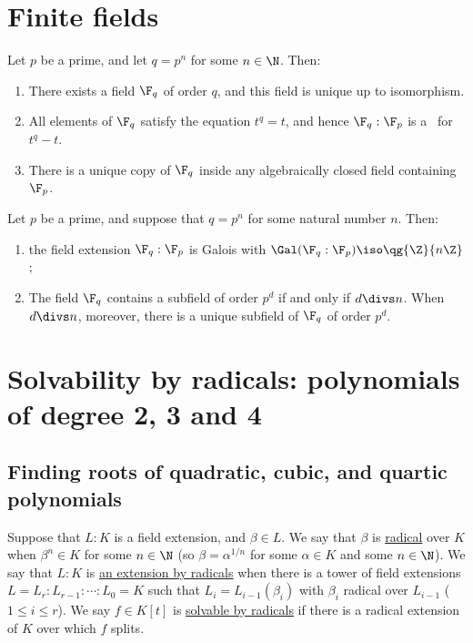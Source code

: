 \documentclass{article}
\begin{document}
\section{Finite fields}
  \begin{ttheorem}
    Let \( p \) be a prime, and let \( q=p^n \) for some \( n\in \N \).
    Then: \begin{enumerate}[label=(\alph*)]
      \item There exists a field \( \F_q \) of order \( q \), and this field is unique up to isomorphism.
      \item All elements of \( \F_q \) satisfy the equation \( t^q=t \), and hence \( \F_q:\F_p \) is a \sfe~for \( t^q-t \).
      \item There is a unique copy of \( \F_q \) inside any algebraically closed field containing \( \F_p \).
    \end{enumerate}
  \end{ttheorem}

  \begin{ttheorem}
    Let \( p \) be a prime, and suppose that \( q=p^n \) for some natural number \( n \).
    Then: \begin{enumerate}[label=(\alph*)]
      \item the field extension \( \F_q:\F_p \) is Galois with \( \Gal(\F_q:\F_p)\iso \qg{\Z}{n\Z} \);
      \item The field \( \F_q \) contains a subfield of order \( p^d \) if and only if \( d\divs n \).
        When \( d\divs n \), moreover, there is a unique subfield of \( \F_q \) of order \( p^d \).
    \end{enumerate}
  \end{ttheorem}

\section{Solvability by radicals: polynomials of degree 2, 3 and 4}
\subsection{Finding roots of quadratic, cubic, and quartic polynomials}
  \begin{tdefinition}
    Suppose that \( L:K \) is a field extension, and \( \beta\in L \).
    We say that \( \beta \) is \ul{radical} over \( K \) when \( \beta^n\in K \) for some \( n\in \N \) (so \( \beta=\alpha^{1/n} \) for some \( \alpha\in K \) and some \( n\in\N \)).
    We say that \( L:K \) is \ul{an extension by radicals} when there is a tower of field extensions \( L=L_r:L_{r-1}:\cdots:L_0=K \) such that \( L_i=L_{i-1}(\beta_i) \) with \( \beta_i \) radical over \( L_{i-1} \) (\( 1\leq i\leq r \)).
    We say \( f\in K[t] \) is \ul{solvable by radicals} if there is a radical extension of \( K \) over which \( f \) splits.
  \end{tdefinition}
\end{document}
